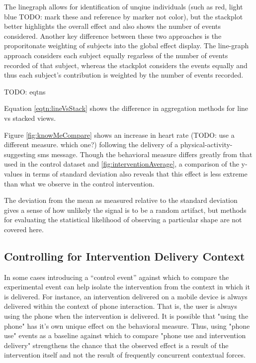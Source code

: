 \documentclass[review,journal]{vgtc}         %
\begin{document}
The linegraph allows for identification of unqiue individuals (such as red, light blue TODO: mark these and reference by marker not color), but the stackplot better highlights the overall effect and also shows the number of events considered.
Another key difference between these two approaches is the proporitonate weighting of subjects into the global effect display.
The line-graph approach considers each subject equally regarless of the number of events recorded of that subject, whereas the stackplot considers the events equally and thus each subject's contribution is weighted by the number of events recorded.

TODO: eqtns

Equation \ref{eqtn:lineVsStack} shows the difference in aggregation methods for line vs stacked views.

Figure \ref{fig:knowMeCompare} shows an increase in heart rate (TODO: use a different measure. which one?) following the delivery of a physical-activity-suggesting sms message.
Though the behavioral measure differs greatly from that used in the control dataset and \ref{fig:interventionAverage}, a comparison of the y-values in terms of standard deviation also reveals that this effect is less extreme than what we observe in the control intervention.

The deviation from the mean as measured relative to the standard deviation gives a sense of how unlikely the signal is to be a random artifact, but methods for evaluating the statistical likelihood of observing a particular shape are not covered here.

\subsection{Controlling for Intervention Delivery Context}
In some cases introducing a “control event” against which to compare the experimental event can help isolate the intervention from the context in which it is delivered.
For instance, an intervention delivered on a mobile device is always delivered within the context of phone interaction.
That is, the user is always using the phone when the intervention is delivered.
It is possible that "using the phone" has it's own unique effect on the behavioral measure.
Thus, using "phone use" events as a baseline against which to compare "phone use and intervention delivery" strengthens the chance that the observed effect is a result of the intervention itself and not the result of frequently concurrent contextual forces.
\end{document}
